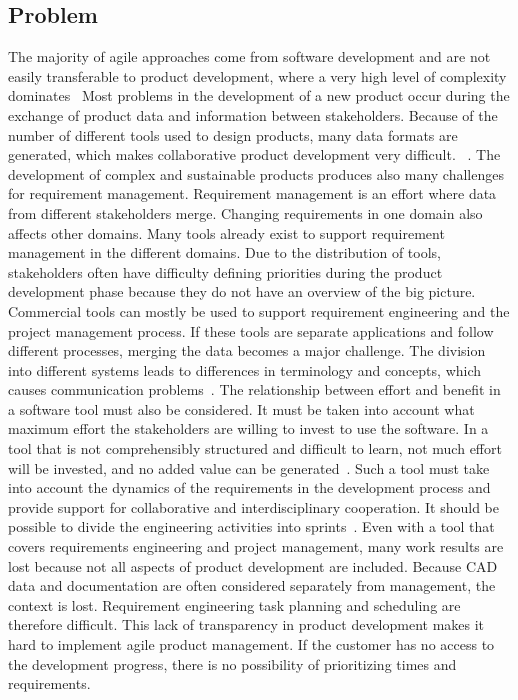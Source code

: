     
    
    \subsection*{Problem}
    The majority of agile approaches come from software development and are not easily transferable to product development, where a very high level of complexity dominates~\cite{HEIMICKE2021786}
    Most problems in the development of a new product occur during the exchange of product data and information between stakeholders. Because of the number of different tools used to design products, many data formats are generated, which makes collaborative product development very difficult. ~\cite{houshmand2010collaborative}.
    The development of complex and sustainable products produces also many challenges for requirement management. Requirement management is an effort where data from different stakeholders merge. 
    Changing requirements in one domain also affects other domains. Many tools already exist to support requirement management in the different domains. Due to the distribution of tools, stakeholders often have difficulty defining priorities during the product development phase because they do not have an overview of the big picture. Commercial tools can mostly be used to support requirement engineering and the project management process. If these tools are separate applications and follow different processes, merging the data becomes a major challenge. The division into different systems leads to differences in terminology and concepts, which causes communication problems~\cite{Jorma2014}.
    The relationship between effort and benefit in a software tool must also be considered. It must be taken into account what maximum effort the stakeholders are willing to invest to use the software. In a tool that is not comprehensibly structured and difficult to learn, not much effort will be invested, and no added value can be generated~\cite{RICHTER2020271}. Such a tool must take into account the dynamics of the requirements in the development process and provide support for collaborative and interdisciplinary cooperation. It should be possible to divide the engineering activities into sprints~\cite{liu2012scenario}.
    Even with a tool that covers requirements engineering and project management, many work results are lost because not all aspects of product development are included. Because CAD data and documentation are often considered separately from management, the context is lost. 
    Requirement engineering task planning and scheduling are therefore difficult.
    This lack of transparency in product development makes it hard to implement agile product management. If the customer has no access to the development progress, there is no possibility of prioritizing times and requirements. 

